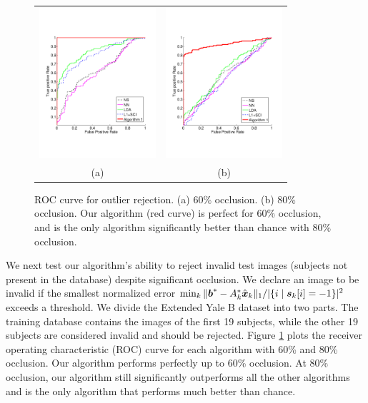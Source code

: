\begin{figure}
\centering
\begin{tabular}{cc}
\includegraphics[height=2.2in]{figures_iccv/roc/eYB-60.pdf}&
\includegraphics[height=2.2in]{figures_iccv/roc/eYB-80.pdf}\\
(a) & (b)
\end{tabular}
\caption{ROC curve for outlier rejection. (a) 60\% occlusion. (b)
80\% occlusion. Our algorithm (red curve) is perfect for 60\% occlusion, and is the only algorithm significantly better than chance with 80\% occlusion.}\label{fig:yale-roc} \vspace{0mm}
\end{figure}

We next test our algorithm's ability to reject invalid test images
(subjects not present in the database) despite significant occlusion.
We declare an image to be invalid if the smallest normalized error
$\min_k \| \boldsymbol{b}^* - A_k^* \hat{{\boldsymbol{x}}}_k \|_1 / | \{ i \mid \boldsymbol{s}_k[i] = -1 \} |^2$ exceeds a threshold.
We divide the Extended Yale B dataset into two parts.
The training database contains the images of the first 19 subjects, while the other 19 subjects
are considered invalid and should be rejected. Figure \ref{fig:yale-roc} plots
the receiver operating characteristic (ROC) curve for each algorithm
with 60\% and 80\% occlusion. Our algorithm performs perfectly up
to 60\% occlusion. At 80\% occlusion, our algorithm still
significantly outperforms all the other algorithms and is the only
algorithm that performs much better than chance.\vspace{0mm}

